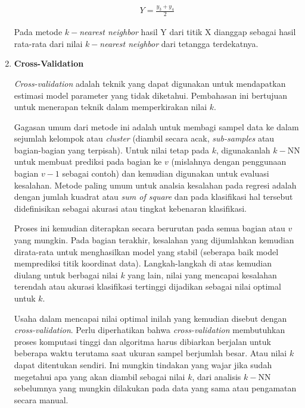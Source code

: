\begin{enumerate}[label=\textbf{\alph*).}]
	\begin{equation}\label{eq: KNN_regresi_mean}
	\begin{split}
	Y = \frac{y_{3} + y_{4}}{2}
	\end{split}
	\end{equation}
	
	Pada metode $k-$\textit{nearest neighbor} hasil Y dari titik X dianggap sebagai hasil rata-rata dari nilai $k-$\textit{nearest neighbor} dari tetangga terdekatnya.
	
	\item \textbf{Cross-Validation}
	
	\textit{Cross-validation} adalah teknik yang dapat digunakan untuk mendapatkan estimasi model parameter yang tidak diketahui. Pembahasan ini bertujuan untuk menerapan teknik dalam memperkirakan nilai $k$. 
	\vspace{1ex}
	
	Gagasan umum dari metode ini adalah untuk membagi sampel data ke dalam sejumlah kelompok atau \textit{cluster} (diambil secara acak, \textit{sub-samples} atau bagian-bagian yang terpisah). Untuk nilai tetap pada $k$, digunakanlah $k-$NN untuk membuat prediksi pada bagian ke $v$ (mislahnya dengan penggunaan bagian $v-1$ sebagai contoh) dan kemudian digunakan untuk evaluasi kesalahan. Metode paling umum untuk analsia kesalahan pada regresi adalah dengan jumlah kuadrat atau \textit{sum of square} dan pada klasifikasi hal tersebut didefinisikan sebagai akurasi atau tingkat kebenaran klasifikasi.
	\vspace{1ex}
	
	Proses ini kemudian diterapkan secara berurutan pada semua bagian atau $v$ yang mungkin. Pada bagian terakhir, kesalahan yang dijumlahkan kemudian dirata-rata untuk menghasilkan model yang stabil (seberapa baik model memprediksi titik koordinat data). Langkah-langkah di atas kemudian diulang untuk berbagai nilai $k$ yang lain, nilai yang mencapai kesalahan terendah atau akurasi klasifikasi tertinggi dijadikan sebagai nilai optimal untuk $k$. 
	\vspace{1ex}
	
	Usaha dalam mencapai nilai optimal inilah yang kemudian disebut dengan \textit{cross-validation}. Perlu diperhatikan bahwa \textit{cross-validation} membutuhkan proses komputasi tinggi dan algoritma harus dibiarkan berjalan untuk beberapa waktu terutama saat ukuran sampel berjumlah besar. Atau nilai $k$ dapat ditentukan sendiri. Ini mungkin tindakan yang wajar jika sudah megetahui apa yang akan diambil sebagai nilai $k$, dari analisis $k-$NN sebelumnya yang mungkin dilakukan pada data yang sama atau pengamatan secara manual.
	

\end{enumerate}
